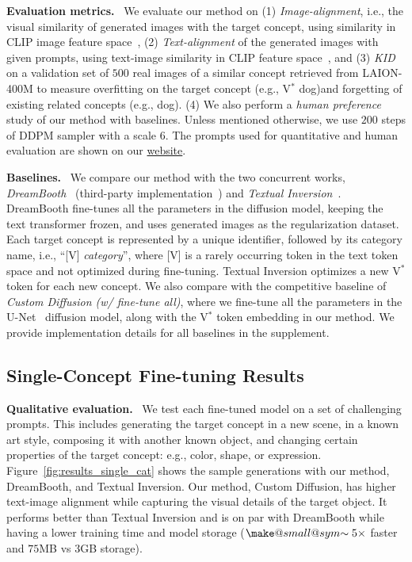   \textbf{Evaluation metrics.} \ 
We evaluate our method on (1) \emph{Image-alignment}, i.e., the visual similarity of generated images with the target concept, using similarity in CLIP image feature space~\cite{gal2022image}, (2) \emph{Text-alignment} of the generated images with given prompts, using text-image similarity in CLIP feature space~\cite{hessel2021clipscore}, and (3) \emph{KID}~\cite{binkowski2018demystifying} on a validation set of $500$ real images of a similar concept retrieved from LAION-400M to measure overfitting on the target concept (e.g., V$^*$ dog)and forgetting of existing related concepts (e.g., dog). (4) We also perform a \emph{human preference} study of our method with baselines. Unless mentioned otherwise, we use $200$ steps of DDPM sampler with a scale $6$. The prompts used for quantitative and human evaluation are shown on our \href{https://www.cs.cmu.edu/~custom-diffusion/}{website}. 

  \textbf{Baselines.} \ 
We compare our method with the two concurrent works, \textit{DreamBooth}~\cite{ruiz2022dreambooth} (third-party implementation~\cite{dreamboothimpl}) and \textit{Textual Inversion}~\cite{gal2022image}. DreamBooth fine-tunes all the parameters in the diffusion model, keeping the text transformer frozen, and uses generated images as the regularization dataset. Each target concept is represented by a unique identifier, followed by its category name, i.e., ``[V] \textit{category}'', where [V] is a rarely occurring token in the text token space and not optimized during fine-tuning. Textual Inversion optimizes a new {\menlo V$^*$} token for each new concept. We also compare with the competitive baseline of \textit{Custom Diffusion (w/ fine-tune all)}, where we fine-tune all the parameters in the U-Net~\cite{ronneberger2015u} diffusion model, along with the {\menlo V$^*$} token embedding in our method. We provide implementation details for all baselines in the supplement.

\subsection{Single-Concept Fine-tuning Results}\label{sec:single_concept_results}

  \textbf{Qualitative evaluation.} \ 
We test each fine-tuned model on a set of challenging prompts. This includes generating the target concept in a new scene, in a known art style, composing it with another known object, and changing certain properties of the target concept: e.g., color, shape, or expression. Figure~\ref{fig:results_single_cat} shows the sample generations with our method, DreamBooth, and Textual Inversion. Our method, Custom Diffusion, has higher text-image alignment while capturing the visual details of the target object. It performs better than Textual Inversion and is on par with DreamBooth while having a lower training time and model storage ($\mathrel{\mathpalette\make@small@sym{\sim}}5\times$ faster and $75$MB vs $3$GB storage). 

